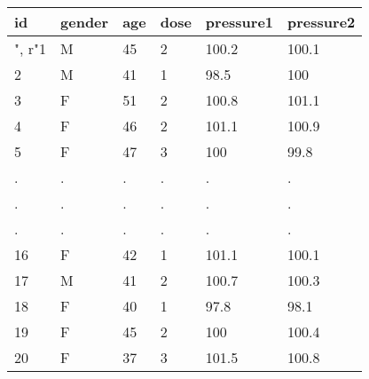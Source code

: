 \documentclass[preview]{standalone}
\begin{document}
\centering \begin{tabular}{llllll}
\hline
id & gender & age & dose & pressure1 & pressure2 \\\hline",
r"1 & M & 45 & 2 & 100.2 & 100.1 \\
2 & M & 41 & 1 & 98.5 & 100 \\
3 & F & 51 & 2 & 100.8 & 101.1 \\
4 & F & 46 & 2 & 101.1 & 100.9 \\
5 & F & 47 & 3 & 100 & 99.8 \\
. & . & . & . & . & . \\
. & . & . & . & . & . \\
. & . & . & . & . & . \\
16 & F & 42 & 1 & 101.1 & 100.1 \\
17 & M & 41 & 2 & 100.7 & 100.3 \\
18 & F & 40 & 1 & 97.8 & 98.1 \\
19 & F & 45 & 2 & 100 & 100.4 \\
20 & F & 37 & 3 & 101.5 & 100.8 \\
\hline
\end{tabular}
\end{document}
